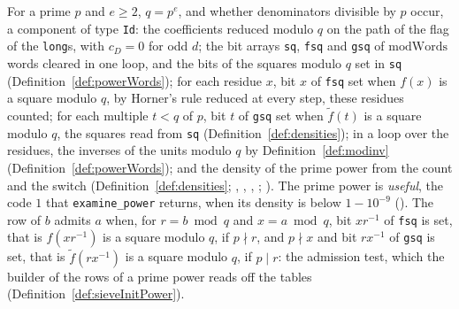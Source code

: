 \begin{definition}\label{def:examinePower}
  \leanok
  For a prime $p$ and $e \ge 2$, $q = p^e$, and whether denominators divisible by $p$ occur, a
  component of type \verb|Id|: the coefficients reduced modulo $q$ on the path of the flag of the
  \verb|long|s, with $c_D = 0$ for odd $d$; the bit arrays \verb|sq|, \verb|fsq| and \verb|gsq|
  of $\mathrm{modWords}$ words cleared in one loop, and the bits of the squares modulo $q$ set in
  \verb|sq| (Definition~\ref{def:powerWords}); for each residue $x$, bit $x$ of \verb|fsq| set
  when $f(x)$ is a square modulo $q$, by Horner's rule reduced at every step, these residues
  counted; for each multiple $t < q$ of $p$, bit $t$ of \verb|gsq| set when $\tilde f(t)$ is a
  square modulo $q$, the squares read from \verb|sq| (Definition~\ref{def:densities}); in a loop
  over the residues, the inverses of the units modulo $q$ by Definition~\ref{def:modinv}
  (Definition~\ref{def:powerWords}); and the density of the prime power from the count and the
  switch (Definition~\ref{def:densities}; ,
  , ,
  ; ). The prime power is
  \emph{useful}, the code $1$ that \verb|examine_power| returns, when its density is below
  $1 - 10^{-9}$ (). The row of $b$ admits $a$
  when, for $r = b \bmod q$ and $x = a \bmod q$, bit $x r^{-1}$ of \verb|fsq| is set, that is
  $f(x r^{-1})$ is a square modulo $q$, if $p \nmid r$, and $p \nmid x$ and bit $r x^{-1}$ of
  \verb|gsq| is set, that is $\tilde f(r x^{-1})$ is a square modulo $q$, if $p \mid r$: the
  admission test, which the builder of the rows of a prime power reads off the tables
  (Definition~\ref{def:sieveInitPower}).
\end{definition}

